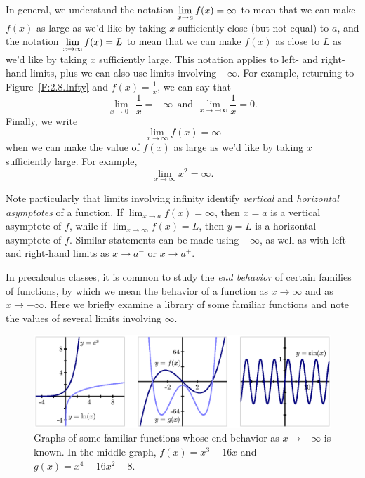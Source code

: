 In general, we understand the notation $\displaystyle \lim_{x \to a} f(x) = \infty$ to mean that we can make $f(x)$ as large as we'd like by taking $x$ sufficiently close (but not equal) to $a$, and the notation $\displaystyle \lim_{x \to \infty} f(x) = L$ to mean that we can make $f(x)$ as close to $L$ as we'd like by taking $x$ sufficiently large.  This notation applies to left- and right-hand limits, plus we can also use limits involving $-\infty$.  For example, returning to Figure~\ref{F:2.8.Infty} and $f(x) = \frac{1}{x}$, we can say that
$$\lim_{x \to 0^-} \frac{1}{x} = -\infty \ \ \mbox{and} \ \ \lim_{x \to -\infty} \frac{1}{x} = 0.$$
Finally, we write
$$\lim_{x \to \infty} f(x) = \infty$$
when we can make the value of $f(x)$ as large as we'd like by taking $x$ sufficiently large.  For example, $$\lim_{x \to \infty} x^2 = \infty.$$

Note particularly that limits involving infinity identify \emph{vertical} and \emph{horizontal asymptotes}    of a function.  If $\lim_{x \to a} f(x) = \infty$, then $x = a$ is a vertical asymptote of $f$, while if $\lim_{x \to \infty} f(x) = L$, then $y = L$ is a horizontal asymptote of $f$.  Similar statements can be made using $-\infty$, as well as with left- and right-hand limits as $x \to a^-$ or $x \to a^+$.

In precalculus classes, it is common to study the \emph{end behavior} of certain families of functions, by which we mean the behavior of a function as $x \to \infty$ and as $x \to -\infty$.  Here we briefly examine a library of some familiar functions and note the values of several limits involving $\infty$.

\begin{figure} %
\begin{flushleft}
\includegraphics{figures/2_8_InftyLib.eps}
\caption{Graphs of some familiar functions whose end behavior as $x \to \pm \infty$ is known.  In the middle graph, $f(x) = x^3 - 16x$ and $g(x) = x^4 - 16x^2 - 8$.} \label{F:2.8.InftyLib}
\end{flushleft}
\end{figure}

